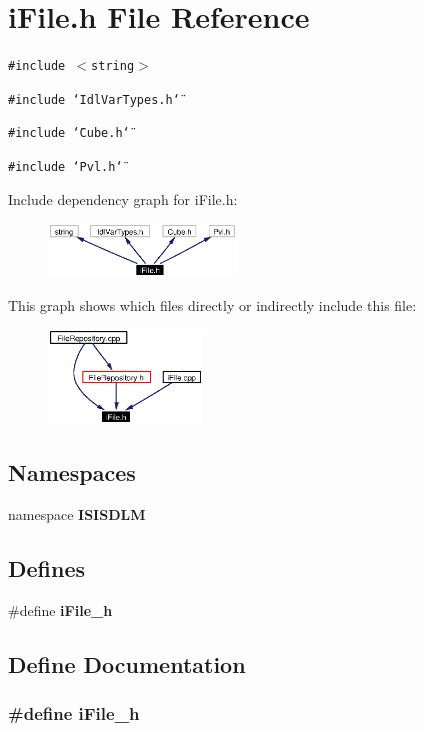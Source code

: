 \section{i\-File.h File Reference}
\label{iFile_8h}
{\tt \#include $<$string$>$}\par
{\tt \#include \char`\"{}Idl\-Var\-Types.h\char`\"{}}\par
{\tt \#include \char`\"{}Cube.h\char`\"{}}\par
{\tt \#include \char`\"{}Pvl.h\char`\"{}}\par


Include dependency graph for i\-File.h:\begin{figure}[H]
\begin{center}
\leavevmode
\includegraphics[width=142pt]{iFile_8h__incl}
\end{center}
\end{figure}


This graph shows which files directly or indirectly include this file:\begin{figure}[H]
\begin{center}
\leavevmode
\includegraphics[width=116pt]{iFile_8h__dep__incl}
\end{center}
\end{figure}
\subsection*{Namespaces}
\begin{CompactItemize}
\item 
namespace {\bf ISISDLM}
\end{CompactItemize}
\subsection*{Defines}
\begin{CompactItemize}
\item 
\#define {\bf i\-File\_\-h}
\end{CompactItemize}


\subsection{Define Documentation}
\subsubsection{\setlength{\rightskip}{0pt plus 5cm}\#define i\-File\_\-h}\label{iFile_8h_a0}


